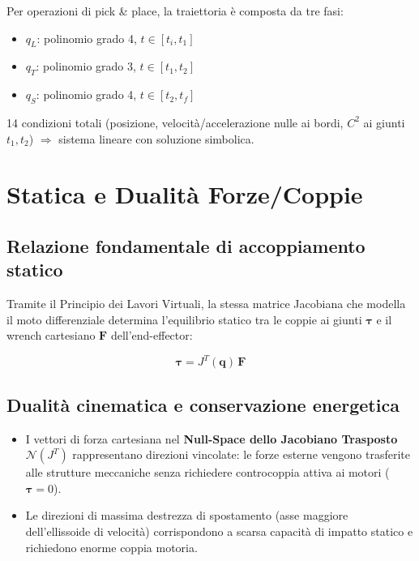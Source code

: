 \documentclass[11pt, a4paper]{article}
\begin{document}
Per operazioni di pick \& place, la traiettoria è composta da tre fasi:
\begin{itemize}[itemsep=2pt]
  \item $q_L$: polinomio grado 4, $t \in [t_i, t_1]$
  \item $q_T$: polinomio grado 3, $t \in [t_1, t_2]$
  \item $q_S$: polinomio grado 4, $t \in [t_2, t_f]$
\end{itemize}

14 condizioni totali (posizione, velocità/accelerazione nulle ai bordi, $C^2$ ai giunti $t_1, t_2$)
$\Rightarrow$ sistema lineare con soluzione simbolica.

\section{Statica e Dualità Forze/Coppie}

\subsection{Relazione fondamentale di accoppiamento statico}

Tramite il Principio dei Lavori Virtuali, la stessa matrice Jacobiana che modella il moto
differenziale determina l'equilibrio statico tra le coppie ai giunti $\boldsymbol{\tau}$ e
il wrench cartesiano $\mathbf{F}$ dell'end-effector:
\begin{formulabox}
\[
\boldsymbol{\tau} = J^T(\mathbf{q})\,\mathbf{F}
\]
\end{formulabox}

\subsection{Dualità cinematica e conservazione energetica}

\begin{itemize}[itemsep=4pt]
  \item I vettori di forza cartesiana nel \textbf{Null-Space dello Jacobiano Trasposto}
        $\mathcal{N}(J^T)$ rappresentano direzioni vincolate: le forze esterne vengono trasferite
        alle strutture meccaniche senza richiedere controcoppia attiva ai motori ($\boldsymbol{\tau} = 0$).
  \item Le direzioni di massima destrezza di spostamento (asse maggiore dell'ellissoide di
        velocità) corrispondono a scarsa capacità di impatto statico e richiedono enorme coppia
        motoria.
\end{itemize}
\end{document}
